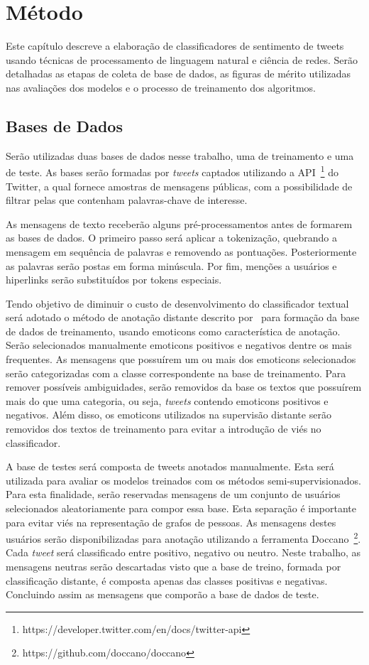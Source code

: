 \chapter{Método}
\label{chapter:method}

Este capítulo descreve a elaboração de classificadores de sentimento de tweets
usando técnicas de processamento de linguagem natural e ciência de redes.
Serão detalhadas as etapas de coleta de base de dados, as figuras de mérito
utilizadas nas avaliações dos modelos e o processo de treinamento dos
algoritmos.

\section{Bases de Dados}

Serão utilizadas duas bases de dados nesse trabalho, uma de treinamento e uma de
teste.
As bases serão formadas por \textit{tweets} captados utilizando a
API~\footnote{https://developer.twitter.com/en/docs/twitter-api} do Twitter,
a qual fornece amostras de mensagens públicas, com a possibilidade de filtrar
pelas que contenham palavras-chave de interesse.

As mensagens de texto receberão alguns pré-processamentos antes de formarem as
bases de dados.
O primeiro passo será aplicar a tokenização, quebrando a mensagem em sequência
de palavras e removendo as pontuações.
Posteriormente as palavras serão postas em forma minúscula.
Por fim, menções a usuários e hiperlinks serão substituídos por tokens especiais.

Tendo objetivo de diminuir o custo de desenvolvimento do classificador textual será
adotado o método de anotação distante descrito por~\citet{go09} para formação da
base de dados de treinamento, usando emoticons como característica de anotação.
Serão selecionados manualmente emoticons positivos e negativos dentre os mais
frequentes.
As mensagens que possuírem um ou mais dos emoticons selecionados serão
categorizadas com a classe correspondente na base de treinamento.
Para remover possíveis ambiguidades, serão removidos da base os textos que
possuírem mais do que uma categoria, ou seja, \textit{tweets} contendo emoticons
positivos e negativos.
Além disso, os emoticons utilizados na supervisão distante serão removidos dos
textos de treinamento para evitar a introdução de viés no classificador.

A base de testes será composta de tweets anotados manualmente.
Esta será utilizada para avaliar os modelos treinados com os métodos
semi-supervisionados.
Para esta finalidade, serão reservadas mensagens de um conjunto de usuários
selecionados aleatoriamente para compor essa base.
Esta separação é importante para evitar viés na representação de grafos de pessoas.
As mensagens destes usuários serão disponibilizadas para anotação utilizando a
ferramenta Doccano~\footnote{https://github.com/doccano/doccano}.
Cada \textit{tweet} será classificado entre positivo, negativo ou neutro.
Neste trabalho, as mensagens neutras serão descartadas visto que a
base de treino, formada por classificação distante, é composta apenas das
classes positivas e negativas.
Concluindo assim as mensagens que comporão a base de dados de teste.

